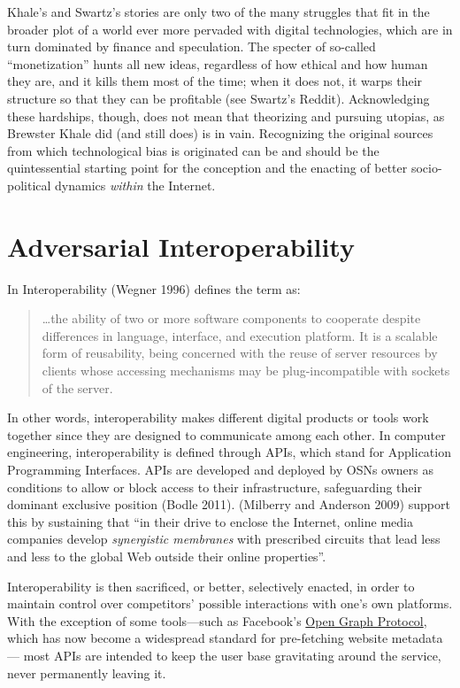 \documentclass[
  a4paper,
]{book}
\begin{document}
Khale's and Swartz's stories are only two of the many struggles that fit in the broader plot of a world ever more pervaded with digital technologies, which are in turn dominated by finance and speculation. The specter of so-called ``monetization'' hunts all new ideas, regardless of how ethical and how human they are, and it kills them most of the time; when it does not, it warps their structure so that they can be profitable (see Swartz's Reddit). Acknowledging these hardships, though, does not mean that theorizing and pursuing utopias, as Brewster Khale did (and still does) is in vain. Recognizing the original sources from which technological bias is originated can be and should be the quintessential starting point for the conception and the enacting of better socio-political dynamics \emph{within} the Internet.

\hypertarget{adversarial-interoperability}{%
\section{Adversarial Interoperability}\label{adversarial-interoperability}}

In Interoperability {(Wegner 1996)} defines the term as:

\begin{quote}
\ldots the ability of two or more software components to cooperate despite differences in language, interface, and execution platform. It is a scalable form of reusability, being concerned with the reuse of server resources by clients whose accessing mechanisms may be plug-incompatible with sockets of the server.
\end{quote}

In other words, interoperability makes different digital products or tools work together since they are designed to communicate among each other. In computer engineering, interoperability is defined through APIs, which stand for Application Programming Interfaces. APIs are developed and deployed by OSNs owners as conditions to allow or block access to their infrastructure, safeguarding their dominant exclusive position {(Bodle 2011)}. {(Milberry and Anderson 2009)} support this by sustaining that ``in their drive to enclose the Internet, online media companies develop \emph{synergistic membranes} with prescribed circuits that lead less and less to the global Web outside their online properties''.

Interoperability is then sacrificed, or better, selectively enacted, in order to maintain control over competitors' possible interactions with one's own platforms. With the exception of some tools---such as Facebook's \href{https://ogp.me}{Open Graph Protocol}, which has now become a widespread standard for pre-fetching website metadata--- most APIs are intended to keep the user base gravitating around the service, never permanently leaving it.
\end{document}
